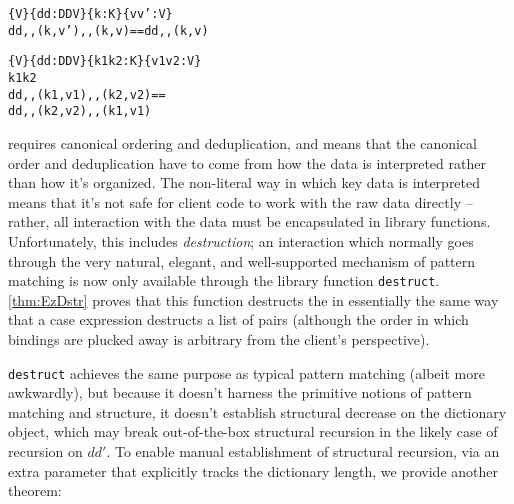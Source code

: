 

\begin{theorem}
\label{thm:cont-dicts}
\justIndent
\begin{alltt}
\altFAll\{V\} \{dd : DD V\} \{k : K\} \{v v' : V\} \altRArr
  dd ,, (k , v') ,, (k , v) == dd ,, (k , v)
\end{alltt}
\end{theorem}

\begin{theorem}
\label{thm:exch-dicts}
\justIndent
\begin{alltt}
\altFAll\{V\} \{dd : DD V\} \{k1 k2 : K\} \{v1 v2 : V\} \altRArr
  k1 \altNE k2 \altRArr
  dd ,, (k1 , v1) ,, (k2 , v2) ==
  dd ,, (k2 , v2) ,, (k1 , v1)
\end{alltt}
\end{theorem}


\SemInj{} requires canonical ordering and deduplication, and \SemTot{} means that the canonical order and deduplication have to come from
how the data is interpreted rather than how it's organized. The non-literal way in which key data is interpreted means that it's not
safe for client code to work with the raw data directly -- rather, all interaction with the data must be
encapsulated in library functions. Unfortunately, this includes \emph{destruction}; an interaction which
normally goes through the very natural, elegant, and well-supported mechanism of pattern matching is now
only available through the library function \verb+destruct+. \autoref{thm:EzDstr} proves that this function
destructs the \dd{} in essentially the same way that a case expression destructs a list of pairs (although
the order in which bindings are plucked away is arbitrary from the client's perspective).

\verb+destruct+ achieves the same purpose as typical pattern matching (albeit more awkwardly), but because it
doesn't harness the primitive notions of pattern matching and structure, it doesn't establish structural
decrease on the dictionary object, which may break out-of-the-box structural recursion in the likely case
of recursion on $dd'$. To enable manual establishment of structural recursion, via an extra parameter that
explicitly tracks the dictionary length, we provide another theorem:

